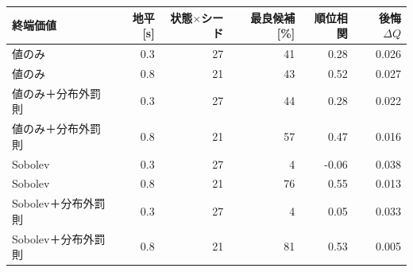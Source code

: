 \begin{tabular}{lrrrrr}
\toprule
終端価値 & 地平 [s] & 状態$\times$シード & 最良候補 [\%] & 順位相関 & 後悔 $\Delta Q$ \\
\midrule
値のみ & 0.3 & 27 & 41 & 0.28 & 0.026 \\
値のみ & 0.8 & 21 & 43 & 0.52 & 0.027 \\
値のみ＋分布外罰則 & 0.3 & 27 & 44 & 0.28 & 0.022 \\
値のみ＋分布外罰則 & 0.8 & 21 & 57 & 0.47 & 0.016 \\
Sobolev & 0.3 & 27 & 4 & -0.06 & 0.038 \\
Sobolev & 0.8 & 21 & 76 & 0.55 & 0.013 \\
Sobolev＋分布外罰則 & 0.3 & 27 & 4 & 0.05 & 0.033 \\
Sobolev＋分布外罰則 & 0.8 & 21 & 81 & 0.53 & 0.005 \\
\bottomrule
\end{tabular}

